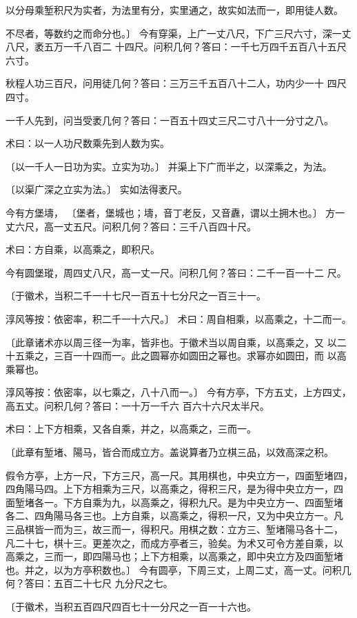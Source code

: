\documentclass[12pt,UTF8]{ctexbook}
\begin{document}
以分母乘堑积尺为实者，为法里有分，实里通之，故实如法而一，即用徒人数。

不尽者，等数约之而命分也。〕 今有穿渠，上广一丈八尺，下广三尺六寸，深一丈八尺，袤五万一千八百二 十四尺。问积几何？答曰：一千七万四千五百八十五尺六寸。

秋程人功三百尺，问用徒几何？答曰：三万三千五百八十二人，功内少一十 四尺四寸。

一千人先到，问当受袤几何？答曰：一百五十四丈三尺二寸八十一分寸之八。

术曰：以一人功尺数乘先到人数为实。

〔以一千人一日功为实。立实为功。〕 并渠上下广而半之，以深乘之，为法。

〔以渠广深之立实为法。〕 实如法得袤尺。

今有方堡壔， 〔堡者，堡城也；壔，音丁老反，又音纛，谓以土拥木也。〕 方一丈六尺，高一丈五尺。问积几何？答曰：三千八百四十尺。

术曰：方自乘，以高乘之，即积尺。

今有圆堡瑽，周四丈八尺，高一丈一尺。问积几何？答曰：二千一百一十二 尺。

〔于徽术，当积二千一十七尺一百五十七分尺之一百三十一。

淳风等按：依密率，积二千一十六尺。〕 术曰：周自相乘，以高乘之，十二而一。

〔此章诸术亦以周三径一为率，皆非也。于徽术当以周自乘，以高乘之，又 以二十五乘之，三百一十四而一。此之圆幂亦如圆田之幂也。求幂亦如圆田，而 以高乘幂也。

淳风等按：依密率，以七乘之，八十八而一。〕 今有方亭，下方五丈，上方四丈，高五丈。问积几何？答曰：一十万一千六 百六十六尺太半尺。

术曰：上下方相乘，又各自乘，并之，以高乘之，三而一。

〔此章有堑堵、陽马，皆合而成立方。盖说算者乃立棋三品，以效高深之积。

假令方亭，上方一尺，下方三尺，高一尺。其用棋也，中央立方一，四面堑堵四， 四角陽马四。上下方相乘为三尺，以高乘之，得积三尺，是为得中央立方一，四 面堑堵各一。下方自乘为九，以高乘之，得积九尺。是为中央立方一、四面堑堵 各二、四角陽马各三也。上方自乘，以高乘之，得积一尺，又为中央立方一。凡 三品棋皆一而为三，故三而一，得积尺。用棋之数：立方三、堑堵陽马各十二， 凡二十七，棋十三。更差次之，而成方亭者三，验矣。为术又可令方差自乘，以 高乘之，三而一，即四陽马也；上下方相乘，以高乘之，即中央立方及四面堑堵 也。并之，以为方亭积数也。〕 今有圆亭，下周三丈，上周二丈，高一丈。问积几何？答曰：五百二十七尺 九分尺之七。

〔于徽术，当积五百四尺四百七十一分尺之一百一十六也。
\end{document}
